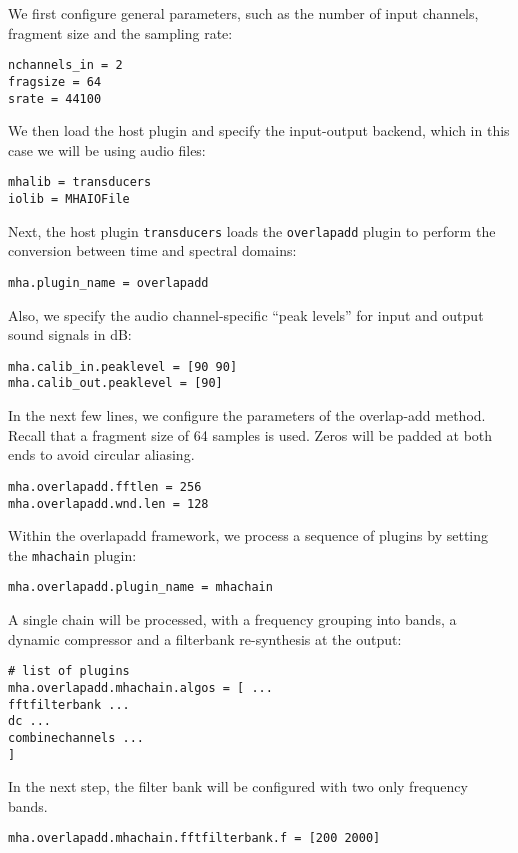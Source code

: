 We first configure general parameters, such as the number of input 
channels, fragment size and the sampling rate:
\begin{verbatim}
nchannels_in = 2
fragsize = 64
srate = 44100
\end{verbatim}
%
We then load the host plugin and specify the input-output backend, which 
in this case we will be using audio files:
\begin{verbatim}
mhalib = transducers
iolib = MHAIOFile
\end{verbatim}
%
Next, the host plugin \verb!transducers! loads the \verb!overlapadd! plugin 
to perform the conversion between time and spectral domains:
\begin{verbatim}
mha.plugin_name = overlapadd
\end{verbatim}
%
Also, we specify the audio channel-specific ``peak levels'' for input and output sound 
signals in dB:
\begin{verbatim}
mha.calib_in.peaklevel = [90 90]
mha.calib_out.peaklevel = [90]
\end{verbatim}
In the next few lines, we configure the parameters of the overlap-add
method. Recall that a fragment size of 64 samples is used. Zeros will be padded
at both ends to avoid circular aliasing.
\begin{verbatim}
mha.overlapadd.fftlen = 256
mha.overlapadd.wnd.len = 128
\end{verbatim}
%
Within the overlapadd framework, we process a sequence of plugins
by setting the \verb!mhachain! plugin:
\begin{verbatim}
mha.overlapadd.plugin_name = mhachain
\end{verbatim}
%
A single chain will be processed, with a frequency grouping into bands, a dynamic 
compressor and a filterbank re-synthesis at the output:
\begin{verbatim}
# list of plugins
mha.overlapadd.mhachain.algos = [ ... 
fftfilterbank ... 
dc ... 
combinechannels ...
]
\end{verbatim}
In the next step, the filter bank will be configured with two only 
frequency bands. 
\begin{verbatim}
mha.overlapadd.mhachain.fftfilterbank.f = [200 2000]
\end{verbatim}
